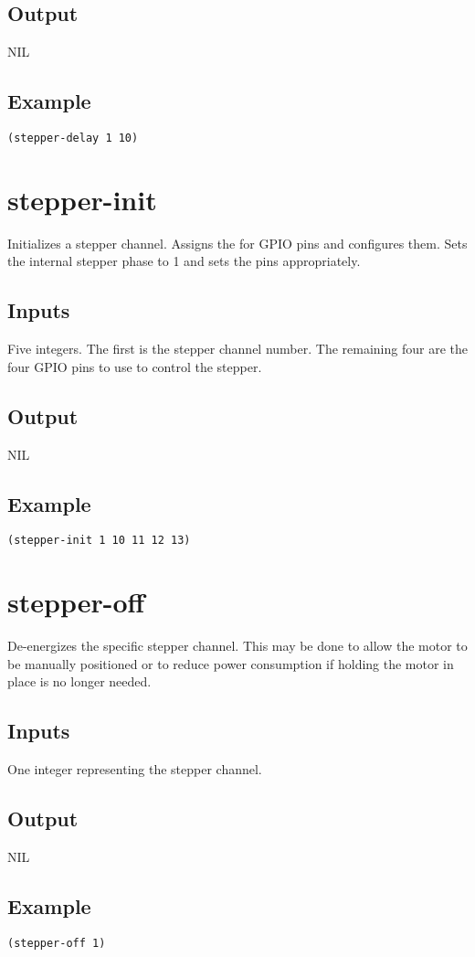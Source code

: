 \documentclass[10pt, openany]{book}
\begin{document}
\subsection{Output}
NIL
\subsection{Example}
\begin{lstlisting}
(stepper-delay 1 10)
\end{lstlisting}

\section{stepper-init}
Initializes a stepper channel.  Assigns the for GPIO pins and configures them.  Sets the internal stepper phase to 1 and sets the pins appropriately.
\subsection{Inputs}
Five integers.  The first is the stepper channel number.  The remaining four are the four GPIO pins to use to control the stepper.
\subsection{Output}
NIL
\subsection{Example}
\begin{lstlisting}
(stepper-init 1 10 11 12 13)
\end{lstlisting}

\section{stepper-off}
De-energizes the specific stepper channel.  This may be done to allow the motor to be manually positioned or to reduce power consumption if holding the motor in place is no longer needed.
\subsection{Inputs}
One integer representing the stepper channel.
\subsection{Output}
NIL
\subsection{Example}
\begin{lstlisting}
(stepper-off 1)
\end{lstlisting}
\end{document}
